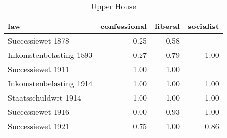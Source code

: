\begin{table}[ht]
\centering
\begin{tabular}{lrrr}
  \hline
law & confessional & liberal & socialist \\ 
  \hline
Successiewet 1878 & 0.25 & 0.58 &  \\ 
  Inkomstenbelasting 1893 & 0.27 & 0.79 & 1.00 \\ 
  Successiewet 1911 & 1.00 & 1.00 &  \\ 
  Inkomstenbelasting 1914 & 1.00 & 1.00 & 1.00 \\ 
  Staatsschuldwet 1914 & 1.00 & 1.00 & 1.00 \\ 
  Successiewet 1916 & 0.00 & 0.93 & 1.00 \\ 
  Successiewet 1921 & 0.75 & 1.00 & 0.86 \\ 
   \hline
\end{tabular}
\caption{Upper House} 
\end{table}

